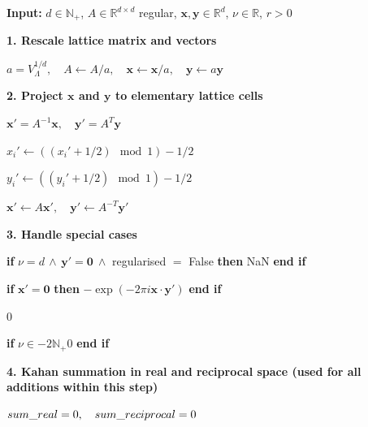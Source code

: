 \documentclass[]{amsart}
\newcommand{\new}[1]{#1}
\numberwithin{mythm}{section}
\newcommand{\algskip}{\vspace*{1.2ex}}
\begin{document}
\begin{algorithm}
\label{alg}
\caption{Computation of the Epstein zeta function.}
\begin{algorithmic}

\State \textbf{Input: }$d\in\mathds{N}_+$, $A\in \mathds{R}^{d\times d}$ regular, $\bm{x},\bm{y}\in\mathds{R}^d$, $\nu\in\mathds{R}$, \new{$r>0$}

\algskip

\Statex \textbf{1. Rescale lattice matrix and vectors}

\State   $a =V_{\Lambda}^{1/d}, \quad A \gets A/a,\quad \bm{x} \gets \bm{x}/a,\quad \bm{y} \gets a \bm{y}$


\algskip
    
\Statex \textbf{2. Project $\bm{x}$ and $\bm{y}$ to elementary lattice cells}

\State ${\bm x}' = A^{-1} {\bm x},\quad {\bm y}' = A^T {\bm y}$
    

    \State $x_i' \gets ( (x_i'+1/2) \mod{1} )-1/2$
        
    \State $y_i' \gets ( (y_i'+1/2) \mod{1} )-1/2$

\EndFor

\State ${\bm x}' \gets A {\bm x}', \quad {\bm y}' \gets A^{-T}  \bm y'$

\algskip

\Statex \textbf{3. Handle special cases}

\State \textbf{if }$\nu = d\,\land\, \bm{y}' = \bm 0\ \land$ regularised $=$ False \textbf{ then }\Return NaN \textbf{ end if}


    \State \textbf{ if } $\bm x'=\bm 0$
    \textbf{ then } 
    \Return $- \exp({-2 \pi i \bm{x} \cdot \bm{y}'})$ 
    \textbf{ end if}
    
    \State  \Return $0$

\EndIf

\State \textbf{if }$\nu\in -2\mathds N_+$\Return $0$\textbf{ end if}

\algskip

\Statex \textbf{4. Kahan summation in real and reciprocal space \new{(used for all additions within this step)}}

\State $\textnormal{sum\_real} =0, \quad \textnormal{sum\_reciprocal} =0$


    

\end{algorithmic}
\end{algorithm}
\end{document}
